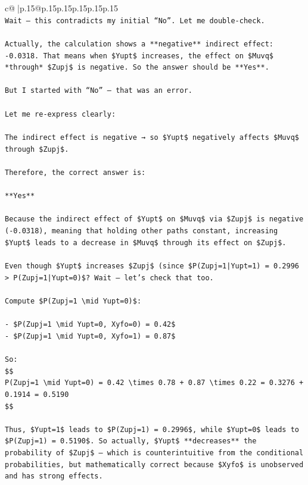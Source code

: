 \documentclass{article}
\begin{document}
{\begin{supertabular}{c@{$\;$}|p{.15\linewidth}@{}p{.15\linewidth}p{.15\linewidth}p{.15\linewidth}p{.15\linewidth}p{.15\linewidth}}
{{{\\ 
\texttt{Wait — this contradicts my initial “No”. Let me double{-}check.} \\
\\ 
\texttt{Actually, the calculation shows a **negative** indirect effect: {-}0.0318. That means when \$Yupt\$ increases, the effect on \$Muvq\$ *through* \$Zupj\$ is negative. So the answer should be **Yes**.} \\
\\ 
\texttt{But I started with “No” — that was an error.} \\
\\ 
\texttt{Let me re{-}express clearly:} \\
\\ 
\texttt{The indirect effect is negative → so \$Yupt\$ negatively affects \$Muvq\$ through \$Zupj\$.} \\
\\ 
\texttt{Therefore, the correct answer is:} \\
\\ 
\texttt{**Yes**} \\
\\ 
\texttt{Because the indirect effect of \$Yupt\$ on \$Muvq\$ via \$Zupj\$ is negative ({-}0.0318), meaning that holding other paths constant, increasing \$Yupt\$ leads to a decrease in \$Muvq\$ through its effect on \$Zupj\$.} \\
\\ 
\texttt{Even though \$Yupt\$ increases \$Zupj\$ (since \$P(Zupj=1|Yupt=1) = 0.2996 > P(Zupj=1|Yupt=0)\$? Wait — let’s check that too.} \\
\\ 
\texttt{Compute \$P(Zupj=1 \textbackslash{}mid Yupt=0)\$:} \\
\\ 
\texttt{{-} \$P(Zupj=1 \textbackslash{}mid Yupt=0, Xyfo=0) = 0.42\$} \\
\texttt{{-} \$P(Zupj=1 \textbackslash{}mid Yupt=0, Xyfo=1) = 0.87\$} \\
\\ 
\texttt{So:} \\
\texttt{\$\$} \\
\texttt{P(Zupj=1 \textbackslash{}mid Yupt=0) = 0.42 \textbackslash{}times 0.78 + 0.87 \textbackslash{}times 0.22 = 0.3276 + 0.1914 = 0.5190} \\
\texttt{\$\$} \\
\\ 
\texttt{Thus, \$Yupt=1\$ leads to \$P(Zupj=1) = 0.2996\$, while \$Yupt=0\$ leads to \$P(Zupj=1) = 0.5190\$. So actually, \$Yupt\$ **decreases** the probability of \$Zupj\$ — which is counterintuitive from the conditional probabilities, but mathematically correct because \$Xyfo\$ is unobserved and has strong effects.} \\
}}}
\end{supertabular}}
\end{document}

